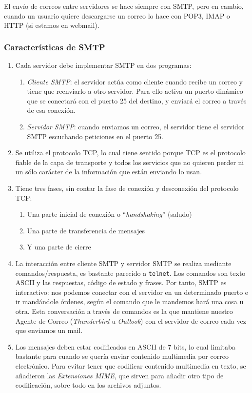 \documentclass[10pt,a4paper,spanish]{report}
\begin{document}
El envío de correos entre servidores se hace siempre con SMTP, pero en cambio, cuando un usuario quiere descargarse un correo lo hace con POP3, IMAP o HTTP (si estamos en webmail).

\subsubsection{\textcolor{tema2}Características de SMTP}
\begin{enumerate}[\color{tema2}{$\heartsuit$}]
\item Cada servidor debe implementar SMTP en dos programas:
\begin{enumerate}[\color{tema2}{$\longrightarrow$}]
  \item \textit{\textcolor{tema2}{Cliente SMTP}}: el servidor actúa como cliente cuando recibe un correo y tiene que reenviarlo a otro servidor. Para ello activa un puerto dinámico que se conectará con el puerto 25 del destino, y enviará el correo a través de esa conexión.
  \item \textit{\textcolor{tema2}{Servidor SMTP}}: cuando enviamos un correo, el servidor tiene el servidor SMTP escuchando peticiones en el puerto 25.
\end{enumerate}
\item Se utiliza el protocolo TCP, lo cual tiene sentido porque TCP es el protocolo fiable de la capa de transporte y todos los servicios que no quieren perder ni un sólo carácter de la información que están enviando lo usan.
\item Tiene tres fases, sin contar la fase de conexión y desconexión del protocolo TCP:
\begin{enumerate}[\color{tema2}{$\bigstar$}]
\item Una parte inicial de conexión o ``\textit{\textcolor{tema2}{handshaking}}'' (saludo)
\item Una parte de transferencia de mensajes
\item Y una parte de cierre
\end{enumerate}
\item La interacción entre cliente SMTP y servidor SMTP se realiza mediante comandos/respuesta, es bastante parecido a \texttt{telnet}. Los comandos son texto ASCII y las respuestas, código de estado y frases. Por tanto, SMTP es interactivo: nos podemos conectar con el servidor en un determinado puerto e ir mandándole órdenes, según el comando que le mandemos hará una cosa u otra. Esta conversación a través de comandos es la que mantiene nuestro Agente de Correo (\textit{\textcolor{tema2}{Thunderbird}} u \textcolor{tema2}{\textit{Outlook}}) con el servidor de correo cada vez que enviamos un mail.
\item Los mensajes deben estar codificados en ASCII de 7 bits, lo cual limitaba bastante para cuando se quería enviar contenido multimedia por correo electrónico. Para evitar tener que codificar contenido multimedia en texto, se añadieron las \textit{\textcolor{tema2}{Extensiones MIME}}, que sirven para añadir otro tipo de codificación, sobre todo en los archivos adjuntos.
\end{enumerate}
\end{document}
